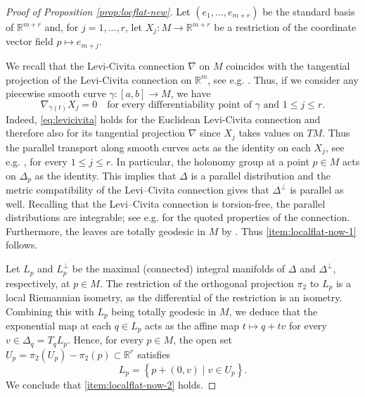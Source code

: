 \documentclass[a4paper,leqno,11pt]{amsart}
\numberwithin{equation}{section}
\theoremstyle{remark}
\theoremstyle{remark}
\newcommand{\R}{\mathbb{R}}
\begin{document}
\begin{proof}[Proof of Proposition \ref{prop:locflat-new}]
Let $(e_1,\ldots, e_{m+r})$ be the standard basis of $\R^{m+r}$ and, for $j=1,\ldots, r$, let $X_j \colon M \to \R^{m+r}$ be a restriction of the coordinate vector field $p \mapsto e_{m+j}$.

We recall that the Levi-Civita connection $\nabla$ on $M$ coincides with the tangential projection of the Levi-Civita connection on $\mathbb{R}^m$, see e.g. \cite[Chapter 5]{Lee:18}. Thus, if we consider any piecewise smooth curve $\gamma \colon [a,b] \to M$, we have
\begin{equation}\label{eq:levicivita}
    \nabla_{ \dot{\gamma}(t) } X_j = 0
    \quad\text{for every differentiability point of $\gamma$ and $1 \leq j \leq r$.}
\end{equation}
Indeed, \eqref{eq:levicivita} holds for the Euclidean Levi-Civita connection and therefore also for its tangential projection $\nabla$ since $X_j$ takes values on $TM$. Thus the parallel transport along smooth curves acts as the identity on each $X_j$, see e.g. \cite[Corollary 4.33, Theorem 4.34, and Corollary 4.35]{Lee:18}, for every $1 \leq j \leq r$. In particular, the holonomy group at a point $p \in M$ acts on $\Delta_p$ as the identity. This implies that $\Delta$ is a parallel distribution and the metric compatibility of the Levi--Civita connection gives that $\Delta^{\perp}$ is parallel as well. Recalling that the Levi--Civita connection is torsion-free, the parallel distributions are integrable; see e.g. \cite[Proposition 5.5]{Lee:18} for the quoted properties of the connection. Furthermore, the leaves are totally geodesic in $M$ by \cite[Proposition 5.1 (2),  p. 180]{Kob:Nom:96}. Thus \eqref{item:localflat-now-1} follows.

Let $L_p$ and $L_{p}^{\perp}$ be the maximal (connected) integral manifolds of $\Delta$ and $\Delta^{\perp}$, respectively, at $p \in M$. The restriction of the orthogonal projection $\pi_2$ to $L_p$ is a local Riemannian isometry, as the differential of the restriction is an isometry. Combining this with $L_p$ being totally geodesic in $M$, we deduce that the exponential map at each $q \in L_p$ acts as the affine map $t \mapsto q + tv$ for every $v \in \Delta_q = T_q L_p$. Hence, for every $p \in M$, the open set $U_p = \pi_2( U_p ) - \pi_2( p ) \subset \mathbb{R}^{ r }$ satisfies
\begin{equation*}
    L_p = \left\{ p + (0,v) \mid v \in U_p \right\}.
\end{equation*}
We conclude that \eqref{item:localflat-now-2} holds.


\end{proof}
\end{document}
